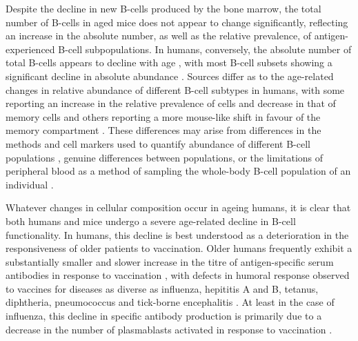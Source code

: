 Despite the decline in new \naive B-cells produced by the bone marrow, the total number of B-cells in aged mice does not appear to change significantly, reflecting an increase in the absolute number, as well as the relative prevalence, of antigen-experienced B-cell subpopulations. In humans, conversely, the absolute number of total B-cells appears to decline with age \parencite{ademokun2010ageing,montecino2013immunosenescence,aberle2013mechanistic}, with most B-cell subsets showing a significant decline in absolute abundance \parencite{frasca2011age}. Sources differ as to the age-related changes in relative abundance of different B-cell subtypes in humans, with some reporting an increase in the relative prevalence of \naive cells and decrease in that of memory cells\parencite{frasca2011age,blomberg2013age} and others reporting a more mouse-like shift in favour of the memory compartment \parencite{ademokun2010ageing}. These differences may arise from differences in the methods and cell markers used to quantify abundance of different B-cell populations \parencite{ademokun2010ageing}, genuine differences between populations, or the limitations of peripheral blood as a method of sampling the whole-body B-cell population of an individual \parencite{siegrist2009extremes}.



Whatever changes in cellular composition occur in ageing humans, it is clear that both humans and mice undergo a severe age-related decline in B-cell functionality. In humans, this decline is best understood as a deterioration in the responsiveness of older patients to vaccination. Older humans frequently exhibit a substantially smaller \parencite{sambhara2009vaccination} and slower \parencite{kogut2012bcells} increase in the titre of antigen-specific serum antibodies in response to vaccination \parencite{sasaki2011limited,aberle2013mechanistic,ademokun2010ageing}, with defects in humoral response observed to vaccines for diseases as diverse as influenza, hepititis A and B, tetanus, diphtheria, pneumococcus and tick-borne encephalitis \parencite{dunnwalters2010bcellageing}. At least in the case of influenza, this decline in specific antibody production is primarily due to a decrease in the number of plasmablasts activated in response to vaccination \parencite{montecino2013immunosenescence,aberle2013mechanistic,sasaki2011limited}.

